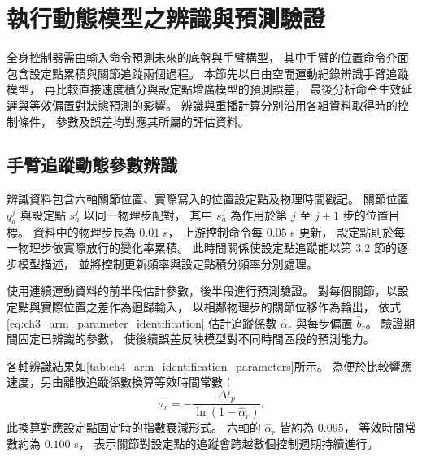 \section{執行動態模型之辨識與預測驗證}
\label{sec:execution_model_validation}

全身控制器需由輸入命令預測未來的底盤與手臂構型，
其中手臂的位置命令介面包含設定點累積與關節追蹤兩個過程。
本節先以自由空間運動紀錄辨識手臂追蹤模型，
再比較直接速度積分與設定點增廣模型的預測誤差，
最後分析命令生效延遲與等效偏置對狀態預測的影響。
辨識與重播計算分別沿用各組資料取得時的控制條件，
參數及誤差均對應其所屬的評估資料。

\subsection{手臂追蹤動態參數辨識}
\label{subsec:arm_tracking_parameter_identification}

辨識資料包含六軸關節位置、實際寫入的位置設定點及物理時間戳記。
關節位置 $q_a^j$ 與設定點 $s_a^j$ 以同一物理步配對，
其中 $s_a^j$ 為作用於第 $j$ 至 $j+1$ 步的位置目標。
資料中的物理步長為 $0.01$ s，
上游控制命令每 $0.05$ s 更新，
設定點則於每一物理步依實際放行的變化率累積。
此時間關係使設定點追蹤能以第 3.2 節的逐步模型描述，
並將控制更新頻率與設定點積分頻率分別處理。

使用連續運動資料的前半段估計參數，後半段進行預測驗證。
對每個關節，以設定點與實際位置之差作為迴歸輸入，
以相鄰物理步的關節位移作為輸出，
依式\eqref{eq:ch3_arm_parameter_identification}
估計追蹤係數 $\hat\alpha_r$ 與每步偏置 $\hat b_r$。
驗證期間固定已辨識的參數，
使後續誤差反映模型對不同時間區段的預測能力。

各軸辨識結果如\cref{tab:ch4_arm_identification_parameters}所示。
為便於比較響應速度，另由離散追蹤係數換算等效時間常數：
\begin{equation}
    \tau_r=-\frac{\Delta t_p}{\ln(1-\hat\alpha_r)}.
    \label{eq:ch4_arm_equivalent_time_constant}
\end{equation}
此換算對應設定點固定時的指數衰減形式。
六軸的 $\hat\alpha_r$ 皆約為 $0.095$，
等效時間常數約為 $0.100$ s，
表示關節對設定點的追蹤會跨越數個控制週期持續進行。

